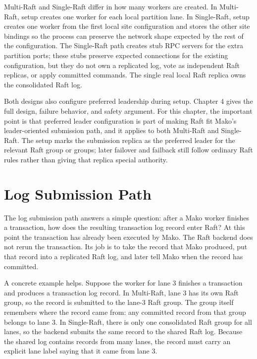 Multi-Raft and Single-Raft differ in how many workers are created. In
Multi-Raft, setup creates one worker for each local partition lane. In
Single-Raft, setup creates one worker from the first local site configuration
and stores the other site bindings so the process can preserve the network
shape expected by the rest of the configuration. The Single-Raft path creates
stub RPC servers for the extra partition ports; these stubs preserve expected
connections for the existing configuration, but they do not own a replicated
log, vote as independent Raft replicas, or apply committed commands. The
single real local Raft replica owns the consolidated Raft log.

Both designs also configure preferred leadership during setup. Chapter 4 gives
the full design, failure behavior, and safety argument. For this chapter, the
important point is that preferred leader configuration is part of making Raft
fit Mako's leader-oriented submission path, and it applies to both Multi-Raft
and Single-Raft. The setup marks the submission replica as the preferred leader
for the relevant Raft group or groups; later failover and failback still follow
ordinary Raft rules rather than giving that replica special authority.

\section{Log Submission Path}

The log submission path answers a simple question: after a Mako worker finishes
a transaction, how does the resulting transaction log record enter Raft? At
this point the transaction has already been executed by Mako. The Raft backend
does not rerun the transaction. Its job is to take the record that Mako
produced, put that record into a replicated Raft log, and later tell Mako when
the record has committed.

A concrete example helps. Suppose the worker for lane 3 finishes a transaction
and produces a transaction log record. In Multi-Raft, lane 3 has its own Raft
group, so the record is submitted to the lane-3 Raft group. The group itself
remembers where the record came from: any committed record from that group
belongs to lane 3. In Single-Raft, there is only one consolidated Raft group
for all lanes, so the backend submits the same record to the shared Raft log.
Because the shared log contains records from many lanes, the record must carry
an explicit lane label saying that it came from lane 3.

